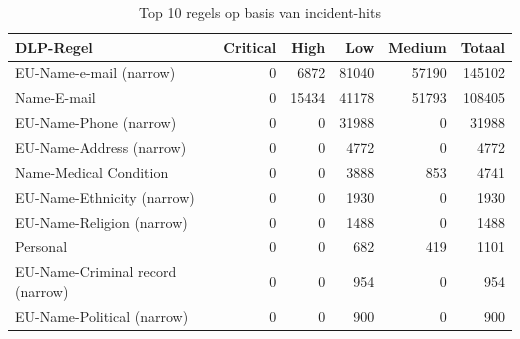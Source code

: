 \begin{table}[H]
  \centering
  \scriptsize
  \begin{tabular}{lrrrrr}
    \toprule
    \textbf{DLP-Regel} & \textbf{Critical} & \textbf{High} & \textbf{Low} & \textbf{Medium} & \textbf{Totaal} \\
    \midrule
    EU-Name-e-mail (narrow)     & 0 & 6872  & 81040 & 57190 & 145102 \\
    Name-E-mail                 & 0 & 15434 & 41178 & 51793 & 108405 \\
    EU-Name-Phone (narrow)     & 0 & 0     & 31988 & 0     & 31988 \\
    EU-Name-Address (narrow)   & 0 & 0     & 4772  & 0     & 4772 \\
    Name-Medical Condition     & 0 & 0     & 3888  & 853   & 4741 \\
    EU-Name-Ethnicity (narrow) & 0 & 0     & 1930  & 0     & 1930 \\
    EU-Name-Religion (narrow)  & 0 & 0     & 1488  & 0     & 1488 \\
    Personal                   & 0 & 0     & 682   & 419   & 1101 \\
    EU-Name-Criminal record (narrow) & 0 & 0 & 954  & 0     & 954 \\
    EU-Name-Political (narrow) & 0 & 0     & 900   & 0     & 900 \\
    \bottomrule
  \end{tabular}
  \caption{Top 10 regels op basis van incident-hits}
  \label{tab:dlp-severity-breakdown}
\end{table}


\section{}
\label{sec:res-vooraf-gedefinieerde-dlp-regels}

